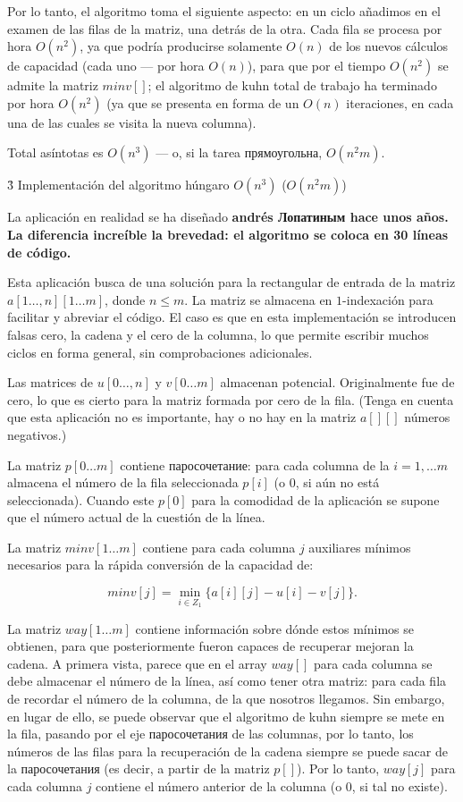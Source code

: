 Por lo tanto, el algoritmo toma el siguiente aspecto: en un ciclo añadimos en el examen de las filas de la matriz, una detrás de la otra. Cada fila se procesa por hora $O(n^2)$, ya que podría producirse solamente $O(n)$ de los nuevos cálculos de capacidad (cada uno --- por hora $O(n)$), para que por el tiempo $O(n^2)$ se admite la matriz $minv[]$; el algoritmo de kuhn total de trabajo ha terminado por hora $O(n^2)$ (ya que se presenta en forma de un $O(n)$ iteraciones, en cada una de las cuales se visita la nueva columna).

Total asíntotas es $O(n^3)$ --- o, si la tarea прямоугольна, $O(n^2 m)$.


\h3{ Implementación del algoritmo húngaro $O(n^3)$ ($O(n^2 m)$) }

La aplicación en realidad se ha diseñado \bf{andrés Лопатиным} hace unos años. La diferencia increíble la brevedad: el algoritmo se coloca en \bf{30 líneas de código}.

Esta aplicación busca de una solución para la rectangular de entrada de la matriz $a[1 \ldots, n][1 \ldots m]$, donde $n \le m$. La matriz se almacena en $1$-indexación para facilitar y abreviar el código. El caso es que en esta implementación se introducen falsas cero, la cadena y el cero de la columna, lo que permite escribir muchos ciclos en forma general, sin comprobaciones adicionales.

Las matrices de $u[0 \ldots, n]$ y $v[0 \ldots m]$ almacenan potencial. Originalmente fue de cero, lo que es cierto para la matriz formada por cero de la fila. (Tenga en cuenta que esta aplicación no es importante, hay o no hay en la matriz $a[][]$ números negativos.)

La matriz $p[0 \ldots m] $ contiene паросочетание: para cada columna de la $i = 1, \ldots m$ almacena el número de la fila seleccionada $p[i]$ (o $0$, si aún no está seleccionada). Cuando este $p[0]$ para la comodidad de la aplicación se supone que el número actual de la cuestión de la línea.

La matriz $minv[1 \ldots m]$ contiene para cada columna $j$ auxiliares mínimos necesarios para la rápida conversión de la capacidad de:

$$ minv[j] = \min_{i \in Z_1} \{ a[i][j] - u[i] - v[j] \}. $$

La matriz $way[1 \ldots m]$ contiene información sobre dónde estos mínimos se obtienen, para que posteriormente fueron capaces de recuperar mejoran la cadena. A primera vista, parece que en el array $way[]$ para cada columna se debe almacenar el número de la línea, así como tener otra matriz: para cada fila de recordar el número de la columna, de la que nosotros llegamos. Sin embargo, en lugar de ello, se puede observar que el algoritmo de kuhn siempre se mete en la fila, pasando por el eje паросочетания de las columnas, por lo tanto, los números de las filas para la recuperación de la cadena siempre se puede sacar de la паросочетания (es decir, a partir de la matriz $p[]$). Por lo tanto, $way[j]$ para cada columna $j$ contiene el número anterior de la columna (o $0$, si tal no existe).


